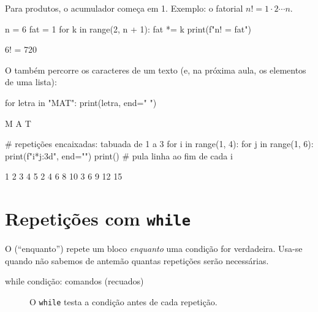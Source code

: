 {{Para produtos, o acumulador começa em 1. Exemplo: o fatorial $n! = 1\cdot 2\cdots n$.

\begin{entrada}
n = 6
fat = 1
for k in range(2, n + 1):
    fat *= k
print(f"{n}! = {fat}")
\end{entrada}
\begin{saida}
6! = 720
\end{saida}

O  também percorre os caracteres de um texto (e, na próxima aula, os elementos de uma lista):

\begin{entrada}
for letra in "MAT":
    print(letra, end=" ")
\end{entrada}
\begin{saida}
M A T
\end{saida}

\begin{entrada}
# repetições encaixadas: tabuada de 1 a 3
for i in range(1, 4):
    for j in range(1, 6):
        print(f"{i*j:3d}", end="")
    print()   # pula linha ao fim de cada i
\end{entrada}
\begin{saida}
  1  2  3  4  5
  2  4  6  8 10
  3  6  9 12 15
\end{saida}

\section{Repetições com \texttt{while}}

O  (``enquanto'') repete um bloco \emph{enquanto} uma condição for verdadeira. Usa-se quando
não sabemos de antemão quantas repetições serão necessárias.

\begin{sintaxe}
while condição:
    comandos (recuados)
\end{sintaxe}

\begin{figure}[ht]
\centering
{}
\caption{O \texttt{while} testa a condição antes de cada repetição.}
\end{figure}

}}
